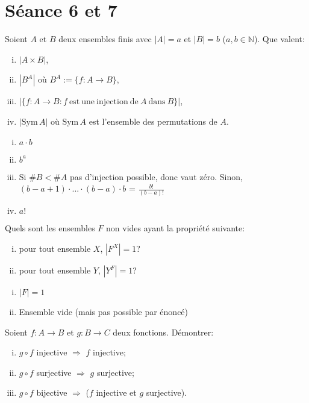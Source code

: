 \section{Séance 6 et 7}

\begin{exo}
Soient $A$ et $B$ deux ensembles finis avec $|A|=a$ et $|B|=b$ ($a,b \in \mathbb{N}$). Que valent:
\begin{enumerate}[(i)]
\item $|A\times B|$,
\item $|B^A|$ o\`u $B^A:=\{f:A \rightarrow B\}$,
\item $|\{f:A \rightarrow B: f \mathrm{~est~une~injection~de~} A \mathrm{~dans~}B\}|$,
\item $|\mathrm{Sym}\,A|$ o\`u $\mathrm{Sym}\,A$ est l'ensemble des permutations de $A$.
\end{enumerate}
\end{exo}

\begin{enumerate}[(i)]
	\item $a\cdot b$
	\item $b^a$
	\item Si $\#B < \#A$ pas d'injection possible, donc vaut zéro. Sinon, $(b-a+1)\cdot ... \cdot (b-a) \cdot b$ = $ \frac{b!}{(b-a)!}$
	\item $a!$
\end{enumerate}


\begin{exo}
Quels sont les ensembles $F$ non vides ayant la propri\'et\'e suivante:
\begin{enumerate}[(i)]
\item pour tout ensemble $X$, $|F^X|=1$?
\item pour tout ensemble $Y$, $|Y^F|=1$?
\end{enumerate}
\end{exo}

\begin{enumerate}[(i)]
	\item $|F| = 1 $
	\item Ensemble vide (mais pas possible par énoncé)
\end{enumerate}


\begin{exo}
Soient $f:A \rightarrow B$ et $g:B \rightarrow C$ deux fonctions. D\'emontrer:
\begin{enumerate}[(i)]
\item $g \circ f$ injective $\Rightarrow$ $f$ injective;
\item $g \circ f$ surjective $\Rightarrow$ $g$ surjective;
\item $g \circ f$ bijective $\Rightarrow$ ($f$ injective et $g$ surjective).
\end{enumerate}
\end{exo}

